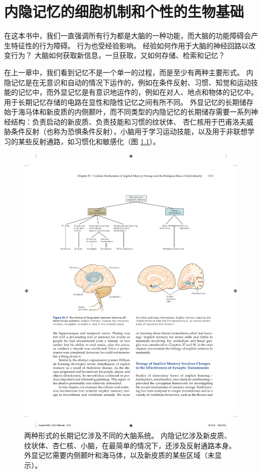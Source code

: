 \chapter{内隐记忆的细胞机制和个性的生物基础} \label{chap:chap53}

在这本书中，我们一直强调所有行为都是大脑的一种功能，而大脑的功能障碍会产生特征性的行为障碍。 行为也受经验影响。 经验如何作用于大脑的神经回路以改变行为？ 大脑如何获取新信息，一旦获取，又如何存储、检索和记忆？

在上一章中，我们看到记忆不是一个单一的过程，而是至少有两种主要形式。 内隐记忆是在无意识和自动的情况下运作的，例如在条件反射、习惯、知觉和运动技能的记忆中，而外显记忆是有意识地运作的，例如在对人、地点和物体的记忆中。 用于长期记忆存储的电路在显性和隐性记忆之间有所不同。 外显记忆的长期储存始于海马体和新皮质的内侧颞叶，而不同类型的内隐记忆的长期储存需要一系列神经结构：负责启动的新皮质、负责技能和习惯的纹状体、 杏仁核用于巴甫洛夫威胁条件反射（也称为恐惧条件反射），小脑用于学习运动技能，以及用于非联想学习的某些反射通路，如习惯化和敏感化（图 \ref{fig:53_1}）。

\begin{figure}[htbp]
	\centering
	\includegraphics[width=0.7\linewidth]{chap53/fig_53_1}
	\caption{两种形式的长期记忆涉及不同的大脑系统。 内隐记忆涉及新皮质、纹状体、杏仁核、小脑，在最简单的情况下，还涉及反射通路本身。 外显记忆需要内侧颞叶和海马体，以及新皮质的某些区域（未显示）。}
	\label{fig:53_1}
\end{figure}

